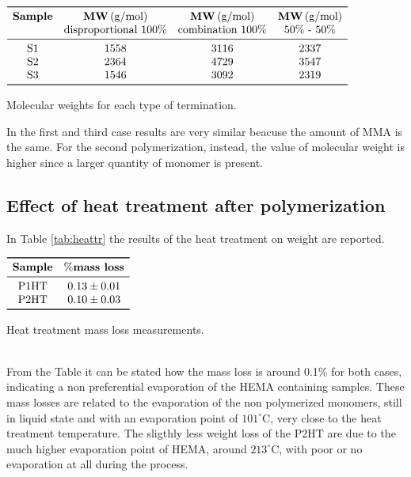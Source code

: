 \documentclass[a4paper, 11pt]{article}
\begin{document}
\begin{table}[htp]
\centering
$
\begin{array}{cccc}
\toprule
\textbf{Sample} & \textbf{MW}\,(\text{g/mol}) & \textbf{MW}\,(\text{g/mol}) & \textbf{MW}\,(\text{g/mol}) \\
& \text{disproportional 100\%} & \text{combination 100\%} & \text{50\% - 50\%} \\
\midrule
\text{S1} & 1558 & 3116 & 2337 \\
\text{S2} & 2364 & 4729 & 3547 \\
\text{S3} & 1546 & 3092 & 2319 \\
\bottomrule
\end{array}
$
\caption{Molecular weights for each type of termination.}
\label{tab:mw}
\end{table}

In the first and third case results are very similar beacuse the amount of MMA is the same. For the second polymerization, instead, the value of molecular weight is higher since a larger quantity of monomer is present.

\subsection{Effect of heat treatment after polymerization}

In Table \ref{tab:heattr} the results of the heat treatment on weight are reported.
\begin{table}[htp]
\centering
$
\begin{array}{cc}
\toprule
\textbf{Sample} & \textbf{$\%$mass loss}  \\
\midrule
\text{P1HT} & 0.13\pm0.01 \\
\text{P2HT} & 0.10\pm0.03 \\
\bottomrule
\end{array}
$
\caption{Heat treatment mass loss measurements.}
\label{tab:heattr}
\end{table}\\
From the Table it can be stated how the mass loss is around 0.1\% for both cases, indicating a non preferential evaporation of the HEMA containing samples. These mass losses are related to the evaporation of the non polymerized monomers, still in liquid state and with an evaporation point of $101^\circ$C, very close to the heat treatment temperature. The sligthly less weight loss of the P2HT are due to the much higher evaporation point of HEMA, around $213^\circ$C, with poor or no evaporation at all during the process. 
\newpage
\end{document}
